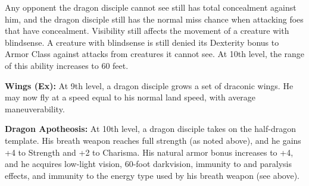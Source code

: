 Any opponent the dragon disciple cannot see still has total concealment against 
him, and the dragon disciple still has the normal miss chance when attacking foes 
that have concealment. Visibility still affects the movement of a creature with 
blindsense. A creature with blindsense is still denied its Dexterity bonus to Armor 
Class against attacks from creatures it cannot see. At 10th level, the range of 
this ability increases to 60 feet.

\textbf{Wings (Ex):} At 9th level, a dragon disciple grows a set of draconic wings. 
He may now fly at a speed equal to his normal land speed, with average maneuverability.

\textbf{Dragon Apotheosis:} At 10th level, a dragon disciple takes on the half-dragon 
template. His breath weapon reaches full strength (as noted above), and he gains 
+4 to Strength and +2 to Charisma. His natural armor bonus increases to +4, and 
he acquires low-light vision, 60-foot darkvision, immunity to  and 
paralysis effects, and immunity to the energy type used by his breath weapon (see 
above).
